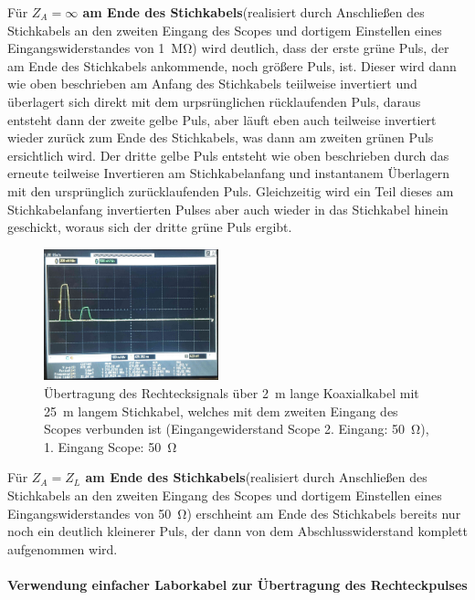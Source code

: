 \documentclass[a4paper,twoside,final]{article}
\begin{document}
Für \textbf{$Z_A = \infty$ am Ende des Stichkabels}(realisiert durch Anschließen des Stichkabels an den zweiten Eingang des Scopes und dortigem Einstellen eines Eingangswiderstandes von \SI{1}{\mega\ohm}) wird deutlich, dass der erste grüne Puls, der am Ende des Stichkabels ankommende, noch größere Puls, ist. Dieser wird dann wie oben beschrieben am Anfang des Stichkabels teiilweise invertiert und überlagert sich direkt mit dem urpsrünglichen rücklaufenden Puls, daraus entsteht dann der zweite gelbe Puls, aber läuft eben auch teilweise invertiert wieder zurück zum Ende des Stichkabels, was dann am zweiten grünen Puls ersichtlich wird. Der dritte gelbe Puls entsteht wie oben beschrieben durch das erneute teilweise Invertieren am Stichkabelanfang und instantanem Überlagern mit den ursprünglich zurücklaufenden Puls. Gleichzeitig wird ein Teil dieses am Stichkabelanfang invertierten Pulses aber auch wieder in das Stichkabel hinein geschickt, woraus sich der dritte grüne Puls ergibt. \\

\begin{figure}[htp]
    \centering
        \includegraphics[width=0.45\textwidth]{Bilder/Bild8.jpg}
    \caption{Übertragung des Rechtecksignals über \SI{2}{\metre} lange Koaxialkabel mit \SI{25}{\metre} langem Stichkabel, welches mit dem zweiten Eingang des Scopes verbunden ist (Eingangewiderstand Scope 2. Eingang: \SI{50}{\ohm}), 1. Eingang Scope: \SI{50}{\ohm}}
\end{figure}

Für \textbf{$Z_A = Z_L$ am Ende des Stichkabels}(realisiert durch Anschließen des Stichkabels an den zweiten Eingang des Scopes und dortigem Einstellen eines Eingangswiderstandes von \SI{50}{\ohm}) erschheint am Ende des Stichkabels bereits nur noch ein deutlich kleinerer Puls, der dann von dem Abschlusswiderstand komplett aufgenommen wird.\\

\paragraph{Verwendung einfacher Laborkabel zur Übertragung des Rechteckpulses}
\end{document}
